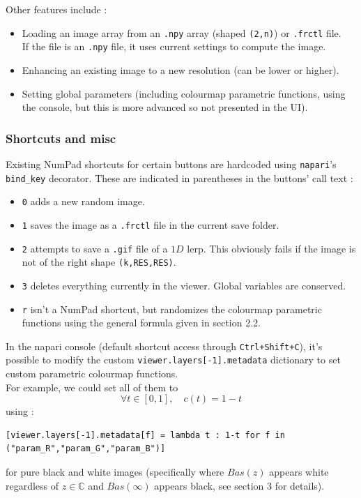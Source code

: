 \documentclass{article}
\newcommand\C{\mathbb{C}}
\begin{document}
Other features include : \\
\begin{itemize}
\item Loading an image array from an \texttt{.npy} array (shaped \texttt{(2,n)}) or \texttt{.frctl} file. \\
If the file is an \texttt{.npy} file, it uses current settings to compute the image.
\item Enhancing an existing image to a new resolution (can be lower or higher). \\
\item Setting global parameters (including colourmap parametric functions, using the console, but this is more advanced so not presented in the UI). 
\end{itemize}

\subsubsection{Shortcuts and misc}

Existing NumPad shortcuts for certain buttons are hardcoded using \texttt{napari}'s \texttt{bind\_key} decorator. These are indicated in parentheses in the buttons' call text : \\
\begin{itemize}
\item \texttt{0} adds a new random image. \\
\item \texttt{1} saves the image as a \texttt{.frctl} file in the current save folder. \\
\item \texttt{2} attempts to save a \texttt{.gif} file of a $1D$ lerp. This obviously fails if the image is not of the right shape \texttt{(k,RES,RES)}. \\
\item \texttt{3} deletes everything currently in the viewer. Global variables are conserved. \\
\item \texttt{r} isn't a NumPad shortcut, but randomizes the colourmap parametric functions using the general formula given in section 2.2.
\end{itemize}

In the napari console (default shortcut access through \texttt{Ctrl+Shift+C}), it's possible to modify the custom \texttt{viewer.layers[-1].metadata} dictionary to set custom parametric colourmap functions. \\
For example, we could set all of them to 
$$\forall t \in [0,1], \quad c(t) = 1-t$$
using : \\
\begin{lstlisting}
[viewer.layers[-1].metadata[f] = lambda t : 1-t for f in ("param_R","param_G","param_B")]
\end{lstlisting}
\vspace{-5mm}
for pure black and white images (specifically where $Bas(z)$ appears white regardless of $z \in \C$ and $Bas(\infty)$ appears black, see \cite{Sut14} section 3 for details). \\
\vspace{5mm}
\end{document}
